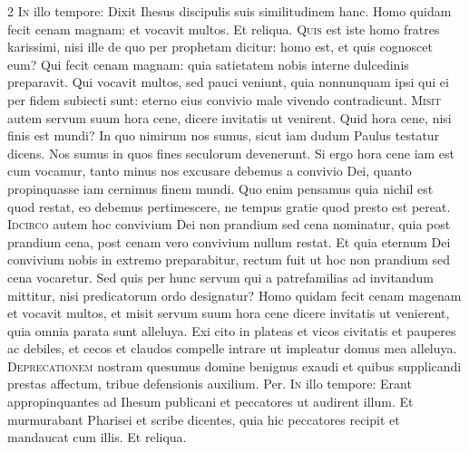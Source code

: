 \begin{multicols*}{2}
\lettrine[lines=2]{\zallmancaps \color{Red} I}{n} illo tempore: Dixit Ihesus discipulis suis similitudinem hanc. Homo quidam fecit cenam magnam: et vocavit multos. Et reliqua.
 \grecross
\lettrine[lines=2]{\zallmancaps \color{Blue} Q}{uis} est iste homo fratres karissimi, nisi ille de quo per prophetam dicitur: homo est, et quis cognoscet eum? Qui fecit cenam magnam: quia satietatem nobis interne dulcedinis preparavit. Qui vocavit multos, sed pauci veniunt, quia nonnunquam ipsi qui ei per fidem subiecti sunt: eterno eius convivio male vivendo contradicunt.
\lettrine[lines=2]{\zallmancaps \color{Red} M}{isit} autem servum suum hora cene, dicere invitatis ut venirent. Quid hora cene, nisi finis est mundi? In quo nimirum nos sumus, sicut iam dudum Paulus testatur dicens. Nos sumus in quos fines seculorum devenerunt. Si ergo hora cene iam est cum vocamur, tanto minus nos excusare debemus a convivio Dei, quanto propinquasse iam cernimus finem mundi. Quo enim pensamus quia nichil est quod restat, eo debemus pertimescere, ne tempus gratie quod presto est pereat.
\lettrine[lines=2]{\zallmancaps \color{Blue} I}{dcirco} autem hoc convivium Dei non prandium sed cena nominatur, quia post prandium cena, post cenam vero convivium nullum restat. Et quia eternum Dei convivium nobis in extremo preparabitur, rectum fuit ut hoc non prandium sed cena vocaretur. Sed quis per hunc servum qui a patrefamilias ad invitandum mittitur, nisi predicatorum ordo designatur?
 Homo quidam fecit cenam magenam et vocavit multos, et misit servum suum hora cene dicere invitatis ut venierent, quia omnia parata sunt alleluya.
 Exi cito in plateas et vicos civitatis et pauperes ac debiles, et cecos et claudos compelle intrare ut impleatur domus mea alleluya.
\lettrine[lines=2]{\zallmancaps \color{Red} D}{eprecationem} nostram quesumus domine benignus exaudi et quibus supplicandi prestas affectum, tribue defensionis auxilium. Per.
\lettrine[lines=2]{\zallmancaps \color{Blue} I}{n} illo tempore: Erant appropinquantes ad Ihesum publicani et peccatores ut audirent illum. Et murmurabant Pharisei et scribe dicentes, quia hic peccatores recipit et mandaucat cum illis. Et reliqua.

\end{multicols*}
